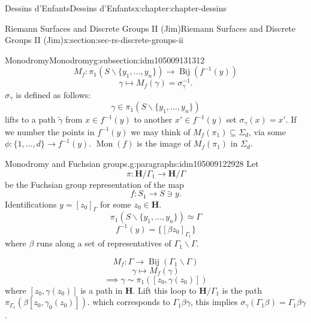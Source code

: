 \documentclass[oneside,10pt,]{book}
\numberwithin{equation}{section}
\newcommand{\inv}{^{-1}}
\newcommand{\lb}{[}
\newcommand{\rb}{]}
\newcommand{\HH}{\mathbf{H}}
\begin{document}
\begin{chapterptx}{Dessins d'Enfants}{}{Dessins d'Enfants}{}{}{x:chapter:chapter-dessins}
\begin{sectionptx}{Riemann Surfaces and Discrete Groups II (Jim)}{}{Riemann Surfaces and Discrete Groups II (Jim)}{}{}{x:section:sec-rs-discrete-groups-ii}
\begin{subsectionptx}{Monodromy}{}{Monodromy}{}{}{g:subsection:idm105009131312}
\begin{equation*}
M_f\colon \pi_1(S \smallsetminus \{y_1, \ldots, y_n\} )\to \operatorname{Bij} (f\inv (y))
\end{equation*}
%
\begin{equation*}
\gamma \mapsto M_f(\gamma) = \sigma_\gamma\inv\text{.}
\end{equation*}
\(\sigma_\gamma\) is defined as follows:%
\begin{equation*}
\gamma \in \pi_1(S\smallsetminus \{ y_1,\ldots, y_n\})
\end{equation*}
lifts to a path \(\widetilde \gamma\) from \(x\in f\inv(y)\) to another \(x' \in f\inv(y)\) set \(\sigma_\gamma(x) =x'\). If we number the points in \(f\inv (y)\) we may think of \(M_f(\pi_1)\subseteq \Sigma_d\), via some \(\phi\colon \{1,\ldots, d\}\to f\inv (y)\). \(\operatorname{Mon}(f)\) is the image of \(M_f(\pi_1)\) in \(\Sigma_d\).%
\begin{paragraphs}{Monodromy and Fuchsian groups.}{g:paragraphs:idm105009122928}%
Let%
\begin{equation*}
\pi \colon \HH/\Gamma_1 \to \HH/ \Gamma
\end{equation*}
be the Fuchsian group representation of the map%
\begin{equation*}
f\colon S_1 \to S\ni y\text{.}
\end{equation*}
Identifications \(y = \lb z_0 \rb_\Gamma\) for some \(z_0 \in \HH\).%
\begin{equation*}
\pi_1 (S\smallsetminus \{y_1,\ldots, y_n\}) \simeq \Gamma
\end{equation*}
%
\begin{equation*}
f\inv(y ) = \{ [\beta z_0]_{\Gamma_1}\}
\end{equation*}
where \(\beta\) runs along a set of representatives of \(\Gamma_1\backslash \Gamma\).%
\par
%
\begin{equation*}
M_f \colon \Gamma \to \operatorname{Bij} (\Gamma_1\backslash \Gamma)
\end{equation*}
%
\begin{equation*}
\gamma \mapsto M_f(\gamma)
\end{equation*}
%
\begin{equation*}
\implies \gamma \sim \pi_1([z_0,\gamma(z_0)])
\end{equation*}
where \(\lb z_0, \gamma(z_0) \rb\) is a path in \(\HH\). Lift this loop to \(\HH/\Gamma_1\) is the path \(\pi_{\Gamma_1}(\beta \lb z_0, \gamma_0(z_0)\rb)\). which corresponds to \(\Gamma_1 \beta \gamma\), this implies \(\sigma_\gamma(\Gamma_1\beta)  = \Gamma_1 \beta\gamma\).%

\end{paragraphs}
\end{subsectionptx}
\end{sectionptx}
\end{chapterptx}
\end{document}
